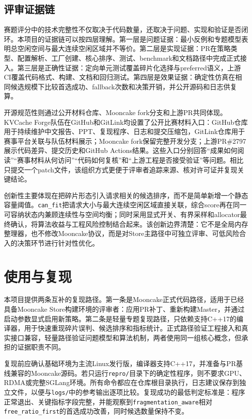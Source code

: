 \documentclass[UTF8,zihao=-4,a4paper]{ctexart}
\newcommand{\artifact}[1]{\texttt{#1}}
\newcommand{\strategy}{\texttt{fragmentation\_aware}}
\newcommand{\baseline}{\texttt{free\_ratio\_first}}
\begin{document}
\subsection{评审证据链}

赛题评分中的技术完整性不仅取决于代码数量，还取决于问题、实现和验证是否闭环。本项目的证据链可以按四层理解。第一层是问题证据：最小反例和专题模型表明总空闲空间与最大连续空闲区域并不等价。第二层是实现证据：PR在策略类型、配置解析、工厂创建、核心排序、测试、benchmark和文档路径中完成正式接入。第三层是正确性证据：定向单元测试覆盖碎片化选择与preferred语义，上游CI覆盖代码格式、构建、文档和回归测试。第四层是效果证据：确定性仿真在相同候选规模下比较首选成功、fallback次数和决策开销，并公开源码和日志供复算。

开源规范性则通过公开材料仓库、Mooncake fork分支和上游PR共同体现。KVCache Forge队伍在GitHub和GitLink均设置了公开比赛材料入口：GitHub仓库用于持续维护中文报告、PPT、复现程序、日志和提交压缩包，GitLink仓库用于赛事平台关联与队伍材料展示；Mooncake fork保留完整开发分支；上游PR\#2797展示代码差异、提交历史和GitHub Actions结果。这些入口分别回答“成果如何阅读”“赛事材料从何访问”“代码如何复核”和“上游工程是否接受验证”等问题。相比只提交一个patch文件，该组织方式更便于评审者追踪来源、核对许可证并复现关键结论。

创新性主要体现在把碎片形态引入请求相关的候选排序，而不是简单新增一个静态容量阈值。\artifact{can\_fit}把请求大小与最大连续空闲区域直接关联，综合score再在同一可容纳状态内兼顾连续性与空间均衡；同时采用显式开关、有界采样和allocator最终确认，将算法收益与工程风险控制结合起来。该创新边界清楚：它不是全局内存整理器，也不修改Mooncake协议，而是对Store主路径中可独立评审、可低风险合入的决策环节进行针对性优化。

\section{使用与复现}

本项目提供两条互补的复现路径。第一条是Mooncake正式代码路径，适用于已经具备Mooncake Store构建环境的评审者：应用PR补丁、重新构建Master，并通过启动参数显式启用新策略。第二条是轻量专题复现路径，只依赖支持C++17的编译器，用于快速重现碎片误判、候选排序和指标统计。正式路径验证工程接入和真实接口兼容，轻量路径验证问题模型和算法机制，两者使用同一组核心概念，但承担的证据职责不同。

复现前应确认基础环境为主流Linux发行版，编译器支持C++17，并准备与PR基线兼容的Mooncake源码。若只运行\artifact{repro/}目录下的确定性程序，则不要求GPU、RDMA或完整SGLang环境。所有命令都应在仓库根目录执行，日志建议保存到独立文件，以便与\artifact{logs/}中的参考输出逐项比较。复现成功的最低判定标准是：程序正常退出、关键指标字段完整，并能观察到\strategy{}相对\baseline{}的首选成功改善，同时候选数量保持不变。
\end{document}
